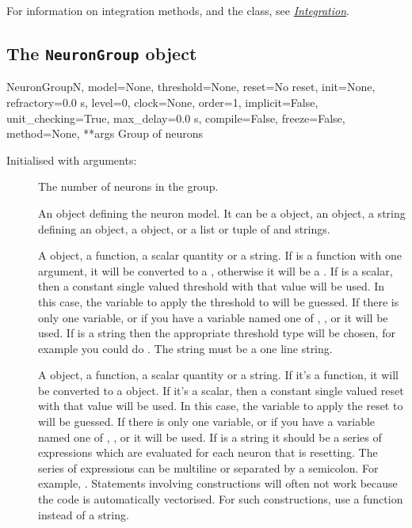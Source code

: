 \documentclass[letterpaper,10pt,english]{manual}
\begin{document}
For information on integration methods, and the 
class, see \hyperlink{integration}{\emph{Integration}}.


\subsection{The \texttt{NeuronGroup} object}

\hypertarget{brian.NeuronGroup}{}\begin{classdesc}{NeuronGroup}{N, model=None, threshold=None, reset=No reset, init=None, refractory=0.0 s, level=0, clock=None, order=1, implicit=False, unit\_checking=True, max\_delay=0.0 s, compile=False, freeze=False, method=None, **args}
Group of neurons

Initialised with arguments:
\begin{description}
\item[]
The number of neurons in the group.

\item[]
An object defining the neuron model. It can be a  object,
an \hyperlink{brian.Equations}{} object, a string defining an \hyperlink{brian.Equations}{} object,
a  object, or a list or tuple of \hyperlink{brian.Equations}{} and
strings.

\item[]
A \hyperlink{brian.Threshold}{} object, a function, a scalar quantity or a string.
If  is a function with one argument, it will be
converted to a \hyperlink{brian.SimpleFunThreshold}{}, otherwise it will be a
\hyperlink{brian.FunThreshold}{}. If  is a scalar, then a constant
single valued threshold with that value will be used. In this case,
the variable to apply the threshold to will be guessed. If there is
only one variable, or if you have a variable named one of
, ,  or  it will be used. If  is a
string then the appropriate threshold type will be chosen, for example
you could do . The string must be a one line
string.

\item[]
A \hyperlink{brian.Reset}{} object, a function, a scalar quantity or a string. If it's a
function, it will be converted to a \hyperlink{brian.FunReset}{} object. If it's
a scalar, then a constant single valued reset with that value will
be used. In this case,
the variable to apply the reset to will be guessed. If there is
only one variable, or if you have a variable named one of
, ,  or  it will be used. If  is a
string it should be a series of expressions which are evaluated for
each neuron that is resetting. The series of expressions can be
multiline or separated by a semicolon. For example,
. Statements involving  constructions
will often not work because the code is automatically vectorised.
For such constructions, use a function instead of a string.


\end{description}
\end{classdesc}
\end{document}
